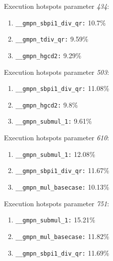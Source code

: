 Execution hotspots parameter \textit{434}:
\begin{enumerate}[noitemsep]
	\item \texttt{\_\_gmpn\_sbpi1\_div\_qr:} 10.7\%
	\item \texttt{\_\_gmpn\_tdiv\_qr:} 9.59\%
	\item \texttt{\_\_gmpn\_hgcd2:} 9.29\%
\end{enumerate}
Execution hotspots parameter \textit{503}:
\begin{enumerate}[noitemsep]
	\item \texttt{\_\_gmpn\_sbpi1\_div\_qr:} 11.08\%
	\item \texttt{\_\_gmpn\_hgcd2:} 9.8\%
	\item \texttt{\_\_gmpn\_submul\_1:} 9.61\%
\end{enumerate}
Execution hotspots parameter \textit{610}:
\begin{enumerate}[noitemsep]
	\item \texttt{\_\_gmpn\_submul\_1:} 12.08\%
	\item \texttt{\_\_gmpn\_sbpi1\_div\_qr:} 11.67\%
	\item \texttt{\_\_gmpn\_mul\_basecase:} 10.13\%
\end{enumerate}
Execution hotspots parameter \textit{751}:
\begin{enumerate}[noitemsep]
	\item \texttt{\_\_gmpn\_submul\_1:} 15.21\%
	\item \texttt{\_\_gmpn\_mul\_basecase:} 11.82\%
	\item \texttt{\_\_gmpn\_sbpi1\_div\_qr:} 11.69\%
\end{enumerate}
